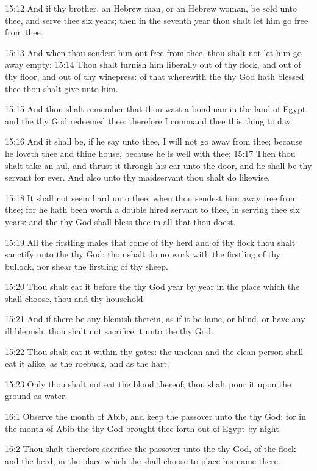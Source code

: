 15:12 And if thy brother, an Hebrew man, or an Hebrew woman, be sold unto thee, and serve thee six years; then in the seventh year thou shalt let him go free from thee.

15:13 And when thou sendest him out free from thee, thou shalt not let him go away empty: 15:14 Thou shalt furnish him liberally out of thy flock, and out of thy floor, and out of thy winepress: of that wherewith the \LORD thy God hath blessed thee thou shalt give unto him.

15:15 And thou shalt remember that thou wast a bondman in the land of Egypt, and the \LORD thy God redeemed thee: therefore I command thee this thing to day.

15:16 And it shall be, if he say unto thee, I will not go away from thee; because he loveth thee and thine house, because he is well with thee; 15:17 Then thou shalt take an aul, and thrust it through his ear unto the door, and he shall be thy servant for ever. And also unto thy maidservant thou shalt do likewise.

15:18 It shall not seem hard unto thee, when thou sendest him away free from thee; for he hath been worth a double hired servant to thee, in serving thee six years: and the \LORD thy God shall bless thee in all that thou doest.

15:19 All the firstling males that come of thy herd and of thy flock thou shalt sanctify unto the \LORD thy God: thou shalt do no work with the firstling of thy bullock, nor shear the firstling of thy sheep.

15:20 Thou shalt eat it before the \LORD thy God year by year in the place which the \LORD shall choose, thou and thy household.

15:21 And if there be any blemish therein, as if it be lame, or blind, or have any ill blemish, thou shalt not sacrifice it unto the \LORD thy God.

15:22 Thou shalt eat it within thy gates: the unclean and the clean person shall eat it alike, as the roebuck, and as the hart.

15:23 Only thou shalt not eat the blood thereof; thou shalt pour it upon the ground as water.

16:1 Observe the month of Abib, and keep the passover unto the \LORD thy God: for in the month of Abib the \LORD thy God brought thee forth out of Egypt by night.

16:2 Thou shalt therefore sacrifice the passover unto the \LORD thy God, of the flock and the herd, in the place which the \LORD shall choose to place his name there.

